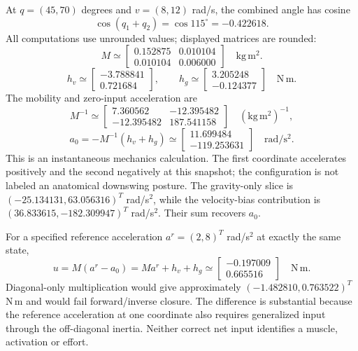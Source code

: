 At $q=(45,70)$ degrees and $v=(8,12)$ rad/s, the combined angle has cosine
\begin{equation}
\cos(q_1+q_2)=\cos115^\circ=-0.422618.
\end{equation} All computations use unrounded values; displayed matrices are rounded:
\begin{equation}
M\simeq\begin{bmatrix}0.152875&0.010104\\0.010104&0.006000\end{bmatrix}
\quad\mathrm{kg\,m^2}.
\label{eq:double_pend_mass_matrix_numerical}
\end{equation}
\label{eq:double_pend_mass_numerical}
\begin{equation}
h_v\simeq\begin{bmatrix}-3.788841\\0.721684\end{bmatrix},\qquad
h_g\simeq\begin{bmatrix}3.205248\\-0.124377\end{bmatrix}
\quad\mathrm{N\,m}.
\label{eq:coriolis_1_numerical}
\end{equation}
The mobility and zero-input acceleration are
\begin{equation}
M^{-1}\simeq\begin{bmatrix}7.360562&-12.395482\\-12.395482&187.541158\end{bmatrix}
\quad(\mathrm{kg\,m^2})^{-1},
\label{eq:mass_inverse}
\end{equation}
\begin{equation}
a_0=-M^{-1}(h_v+h_g)\simeq\begin{bmatrix}11.699484\\-119.253631\end{bmatrix}
\quad\mathrm{rad/s^2}.
\label{eq:ztcf_accel_vector}
\end{equation}
This is an instantaneous mechanics calculation. The first coordinate accelerates positively and the second negatively at this snapshot; the configuration is not labeled an anatomical downswing posture. The gravity-only slice is $(-25.134131,63.056316)^T$ rad/s$^2$, while the velocity-bias contribution is $(36.833615,-182.309947)^T$ rad/s$^2$. Their sum recovers $a_0$.

For a specified reference acceleration $a^r=(2,8)^T$ rad/s$^2$ at exactly the same state,
\begin{equation}
u=M(a^r-a_0)=Ma^r+h_v+h_g
\simeq\begin{bmatrix}-0.197009\\0.665516\end{bmatrix}\quad\mathrm{N\,m}.
\end{equation}
Diagonal-only multiplication would give approximately $(-1.482810,0.763522)^T$ N\,m and would fail forward/inverse closure. The difference is substantial because the reference acceleration at one coordinate also requires generalized input through the off-diagonal inertia. Neither correct net input identifies a muscle, activation or effort.

